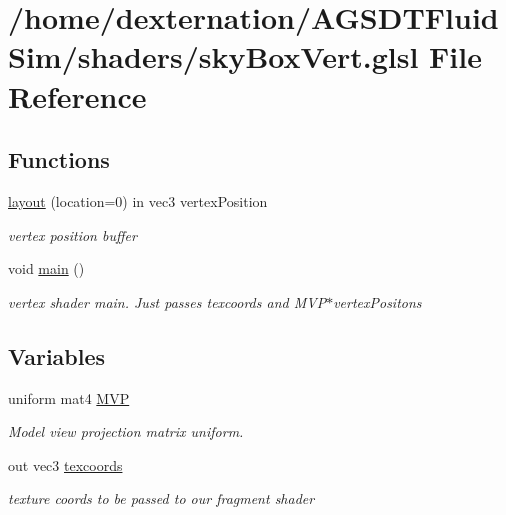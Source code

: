 \hypertarget{sky_box_vert_8glsl}{\section{/home/dexternation/\-A\-G\-S\-D\-T\-Fluid\-Sim/shaders/sky\-Box\-Vert.glsl File Reference}
\label{sky_box_vert_8glsl}
}
\subsection*{Functions}
\begin{DoxyCompactItemize}
\item 
\hypertarget{sky_box_vert_8glsl_a3a9bed495f596aa8aed4121aacc43fdd}{\hyperlink{sky_box_vert_8glsl_a3a9bed495f596aa8aed4121aacc43fdd}{layout} (location=0) in vec3 vertex\-Position}\label{sky_box_vert_8glsl_a3a9bed495f596aa8aed4121aacc43fdd}

\begin{DoxyCompactList}\small\item\em vertex position buffer \end{DoxyCompactList}\item 
\hypertarget{sky_box_vert_8glsl_acdef7a1fd863a6d3770c1268cb06add3}{void \hyperlink{sky_box_vert_8glsl_acdef7a1fd863a6d3770c1268cb06add3}{main} ()}\label{sky_box_vert_8glsl_acdef7a1fd863a6d3770c1268cb06add3}

\begin{DoxyCompactList}\small\item\em vertex shader main. Just passes texcoords and M\-V\-P$\ast$vertex\-Positons \end{DoxyCompactList}\end{DoxyCompactItemize}
\subsection*{Variables}
\begin{DoxyCompactItemize}
\item 
\hypertarget{sky_box_vert_8glsl_ae56d8b04842b99426c8844c0785d3090}{uniform mat4 \hyperlink{sky_box_vert_8glsl_ae56d8b04842b99426c8844c0785d3090}{M\-V\-P}}\label{sky_box_vert_8glsl_ae56d8b04842b99426c8844c0785d3090}

\begin{DoxyCompactList}\small\item\em Model view projection matrix uniform. \end{DoxyCompactList}\item 
\hypertarget{sky_box_vert_8glsl_a71c0fbb5bdc732da08d0a88822242470}{out vec3 \hyperlink{sky_box_vert_8glsl_a71c0fbb5bdc732da08d0a88822242470}{texcoords}}\label{sky_box_vert_8glsl_a71c0fbb5bdc732da08d0a88822242470}

\begin{DoxyCompactList}\small\item\em texture coords to be passed to our fragment shader \end{DoxyCompactList}\end{DoxyCompactItemize}


